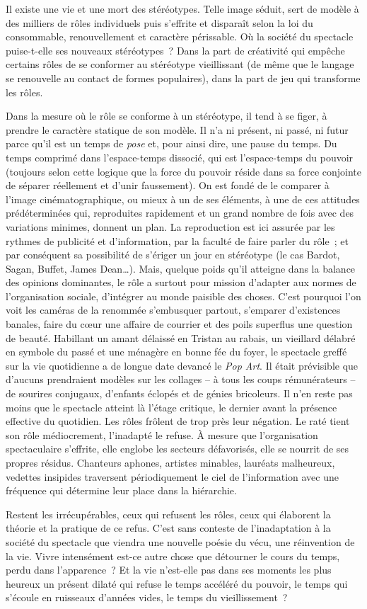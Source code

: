 \documentclass[french,twoside]{book} %
\begin{document}
\noindent Il existe une vie et une mort des stéréotypes. Telle image séduit, sert de modèle à des milliers de rôles individuels puis s’effrite et disparaît selon la loi du consommable, renouvellement et caractère périssable. Où la société du spectacle puise-t-elle ses nouveaux stéréotypes ? Dans la part de créativité qui empêche certains rôles de se conformer au stéréotype vieillissant (de même que le langage se renouvelle au contact de formes populaires), dans la part de jeu qui transforme les rôles.\par
Dans la mesure où le rôle se conforme à un stéréotype, il tend à se figer, à prendre le caractère statique de son modèle. Il n’a ni présent, ni passé, ni futur parce qu’il est un temps de \emph{pose} et, pour ainsi dire, une pause du temps. Du temps comprimé dans l’espace-temps dissocié, qui est l’espace-temps du pouvoir (toujours selon cette logique que la force du pouvoir réside dans sa force conjointe de séparer réellement et d’unir faussement). On est fondé de le comparer à l’image cinématographique, ou mieux à un de ses éléments, à une de ces attitudes prédéterminées qui, reproduites rapidement et un grand nombre de fois avec des variations minimes, donnent un plan. La reproduction est ici assurée par les rythmes de publicité et d’information, par la faculté de faire parler du rôle ; et par conséquent sa possibilité de s’ériger un jour en stéréotype (le cas Bardot, Sagan, Buffet, James Dean…). Mais, quelque poids qu’il atteigne dans la balance des opinions dominantes, le rôle a surtout pour mission d’adapter aux normes de l’organisation sociale, d’intégrer au monde paisible des choses. C’est pourquoi l’on voit les caméras de la renommée s’embusquer partout, s’emparer d’existences banales, faire du cœur une affaire de courrier et des poils superflus une question de beauté. Habillant un amant délaissé en Tristan au rabais, un vieillard délabré en symbole du passé et une ménagère en bonne fée du foyer, le spectacle greffé sur la vie quotidienne a de longue date devancé le \emph{Pop Art}. Il était prévisible que d’aucuns prendraient modèles sur les collages – à tous les coups rémunérateurs – de sourires conjugaux, d’enfants éclopés et de génies bricoleurs. Il n’en reste pas moins que le spectacle atteint là l’étage critique, le dernier avant la présence effective du quotidien. Les rôles frôlent de trop près leur négation. Le raté tient son rôle médiocrement, l’inadapté le refuse. À mesure que l’organisation spectaculaire s’effrite, elle englobe les secteurs défavorisés, elle se nourrit de ses propres résidus. Chanteurs aphones, artistes minables, lauréats malheureux, vedettes insipides traversent périodiquement le ciel de l’information avec une fréquence qui détermine leur place dans la hiérarchie.\par
Restent les irrécupérables, ceux qui refusent les rôles, ceux qui élaborent la théorie et la pratique de ce refus. C’est sans conteste de l’inadaptation à la société du spectacle que viendra une nouvelle poésie du vécu, une réinvention de la vie. Vivre intensément est-ce autre chose que détourner le cours du temps, perdu dans l’apparence ? Et la vie n’est-elle pas dans ses moments les plus heureux un présent dilaté qui refuse le temps accéléré du pouvoir, le temps qui s’écoule en ruisseaux d’années vides, le temps du vieillissement ?
\end{document}
